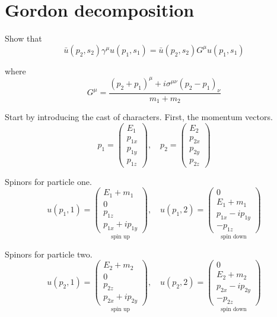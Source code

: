 

\section*{Gordon decomposition}

Show that
\begin{equation*}
\bar{u}(p_2,s_2)\gamma^\mu u(p_1,s_1)
=\bar{u}(p_2,s_2)G^\mu u(p_1,s_1)
\end{equation*}

where
\begin{equation*}
G^\mu=\frac{(p_2+p_1)^\mu+i\sigma^{\mu\nu}(p_2-p_1)_\nu}{m_1+m_2}
\end{equation*}

Start by introducing the cast of characters.
First, the momentum vectors.
\begin{equation*}
p_1=\begin{pmatrix}E_1\\p_{1x}\\p_{1y}\\p_{1z}\end{pmatrix},\quad
p_2=\begin{pmatrix}E_2\\p_{2x}\\p_{2y}\\p_{2z}\end{pmatrix}
\end{equation*}

Spinors for particle one.
\begin{equation*}
u(p_1,1)=\underset{\text{spin up}}
{\begin{pmatrix}E_1+m_1\\0\\p_{1z}\\p_{1x}+ip_{1y}\end{pmatrix}},\quad
u(p_1,2)=\underset{\text{spin down}}
{\begin{pmatrix}0\\E_1+m_1\\p_{1x}-ip_{1y}\\-p_{1z}\end{pmatrix}}
\end{equation*}

Spinors for particle two.
\begin{equation*}
u(p_2,1)=\underset{\text{spin up}}
{\begin{pmatrix}E_2+m_2\\0\\p_{2z}\\p_{2x}+ip_{2y}\end{pmatrix}},\quad
u(p_2,2)=\underset{\text{spin down}}
{\begin{pmatrix}0\\E_2+m_2\\p_{2x}-ip_{2y}\\-p_{2z}\end{pmatrix}}
\end{equation*}

